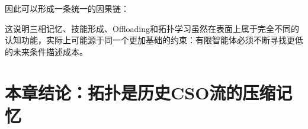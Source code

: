 \begin{statementbox}
\centering
{}
\end{statementbox}

\begin{statementbox}
\centering
{}
\end{statementbox}

\begin{statementbox}
\centering
{}
\end{statementbox}

\begin{statementbox}
\centering
{}
\end{statementbox}

\begin{statementbox}
\centering
{}
\end{statementbox}

因此可以形成一条统一的因果链：
\begin{statementbox}
\centering
{}
\end{statementbox}

这说明三相记忆、技能形成、Offloading和拓扑学习虽然在表面上属于完全不同的认知功能，实际上可能源于同一个更加基础的约束：有限智能体必须不断寻找更低的未来条件描述成本。

\section{本章结论：拓扑是历史CSO流的压缩记忆}

